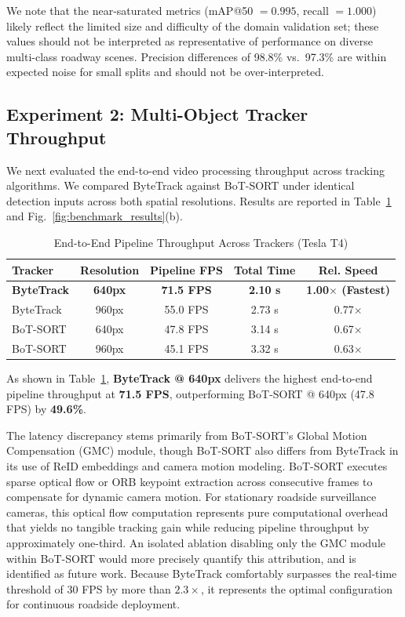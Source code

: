 We note that the near-saturated metrics (mAP@50 $= 0.995$, recall $= 1.000$) likely reflect the limited size and difficulty of the domain validation set; these values should not be interpreted as representative of performance on diverse multi-class roadway scenes. Precision differences of 98.8\% vs.\ 97.3\% are within expected noise for small splits and should not be over-interpreted.

\subsection{Experiment 2: Multi-Object Tracker Throughput}
We next evaluated the end-to-end video processing throughput across tracking algorithms. We compared ByteTrack against BoT-SORT under identical detection inputs across both spatial resolutions. Results are reported in Table~\ref{tab:tracker_benchmark} and Fig.~\ref{fig:benchmark_results}(b).

\begin{table}[ht]
\centering
\caption{End-to-End Pipeline Throughput Across Trackers (Tesla T4)}
\label{tab:tracker_benchmark}
\begin{tabular}{lcccc}
\toprule
\textbf{Tracker} & \textbf{Resolution} & \textbf{Pipeline FPS} & \textbf{Total Time} & \textbf{Rel. Speed} \\
\midrule
\textbf{ByteTrack} & \textbf{640px} & \textbf{71.5 FPS} & \textbf{2.10 s} & \textbf{1.00$\times$ (Fastest)} \\
ByteTrack & 960px & 55.0 FPS & 2.73 s & 0.77$\times$ \\
BoT-SORT & 640px & 47.8 FPS & 3.14 s & 0.67$\times$ \\
BoT-SORT & 960px & 45.1 FPS & 3.32 s & 0.63$\times$ \\
\bottomrule
\end{tabular}
\end{table}

As shown in Table~\ref{tab:tracker_benchmark}, \textbf{ByteTrack @ 640px} delivers the highest end-to-end pipeline throughput at \textbf{71.5 FPS}, outperforming BoT-SORT @ 640px (47.8 FPS) by \textbf{49.6\%}. 

The latency discrepancy stems primarily from BoT-SORT's Global Motion Compensation (GMC) module, though BoT-SORT also differs from ByteTrack in its use of ReID embeddings and camera motion modeling. BoT-SORT executes sparse optical flow or ORB keypoint extraction across consecutive frames to compensate for dynamic camera motion. For stationary roadside surveillance cameras, this optical flow computation represents pure computational overhead that yields no tangible tracking gain while reducing pipeline throughput by approximately one-third. An isolated ablation disabling only the GMC module within BoT-SORT would more precisely quantify this attribution, and is identified as future work. Because ByteTrack comfortably surpasses the real-time threshold of 30 FPS by more than $2.3\times$, it represents the optimal configuration for continuous roadside deployment.


